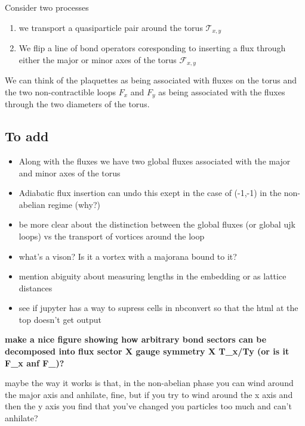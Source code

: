 Consider two processes

\begin{enumerate}
\def\labelenumi{\arabic{enumi})}
\item
  we transport a quasiparticle pair around the torus
  \(\mathcal{T}_{x,y}\)
\item
  We flip a line of bond operators coresponding to inserting a flux
  through either the major or minor axes of the torus
  \(\mathcal{F}_{x,y}\)
\end{enumerate}

We can think of the plaquettes as being associated with fluxes on the
torus and the two non-contractible loops \(F_x\) and \(F_y\) as being
associated with the fluxes through the two diameters of the torus.

{}

\hypertarget{to-add}{%
\subsection{To add}\label{to-add}}

\begin{itemize}
\tightlist
\item
  Along with the fluxes we have two global fluxes associated with the
  major and minor axes of the torus
\item
  Adiabatic flux insertion can undo this exept in the case of (-1,-1) in
  the non-abelian regime (why?)
\item
  be more clear about the distinction between the global fluxes (or
  global ujk loops) vs the transport of vortices around the loop
\item
  what's a vison? Is it a vortex with a majorana bound to it?
\item
  mention abiguity about measuring lengths in the embedding or as
  lattice distances
\item
  see if jupyter has a way to supress cells in nbconvert so that the
  html at the top doesn't get output
\end{itemize}

\textbf{make a nice figure showing how arbitrary bond sectors can be
decomposed into flux sector X gauge symmetry X T\_x/Ty (or is it F\_x
anf F\_)?}

maybe the way it works is that, in the non-abelian phase you can wind
around the major axis and anhilate, fine, but if you try to wind around
the x axis and then the y axis you find that you've changed you
particles too much and can't anhilate?

